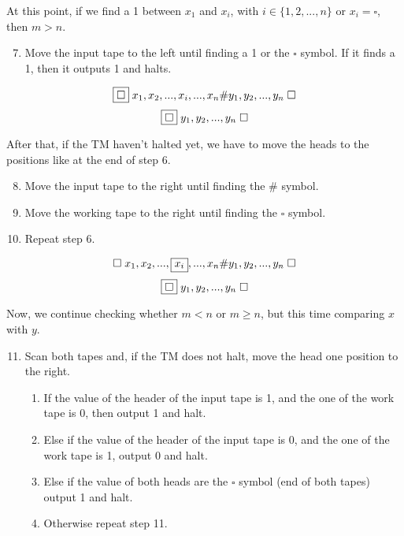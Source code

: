 \documentclass[a4paper, 10pt]{article}
\begin{document}
At this point, if we find a 1 between $x_1$ and $x_i$, with $i \in \{1,2,...,n\}$ or $x_i = \square$, then $m > n$.
\begin{enumerate}\setcounter{enumi}{6}
    \item Move the input tape to the left until finding a 1 or the $\square$ symbol. If it finds a 1, then it outputs 1 and halts.
\end{enumerate}
\[
    \boxed{\square} \hspace{1mm} x_1,x_2,...,x_i,...,x_n \# y_1,y_2,...,y_n \hspace{1mm} \square
\]
\[
    \boxed{\square} \hspace{1mm} y_1,y_2,...,y_n \hspace{1mm} \square   
\]

After that, if the TM haven't halted yet, we have to move the heads to the positions like at the end of step 6.
\begin{enumerate}\setcounter{enumi}{7}
    \item Move the input tape to the right until finding the $\#$ symbol.
    \item Move the working tape to the right until finding the $\square$ symbol.
    \item Repeat step 6.
\end{enumerate}

\[
    \square \hspace{1mm} x_1,x_2,...,\boxed{x_i},...,x_n \# y_1,y_2,...,y_n \hspace{1mm} \square
\]
\[
    \boxed{\square} \hspace{1mm} y_1,y_2,...,y_n \hspace{1mm} \square   
\]

Now, we continue checking whether $m < n$ or $m \geq n$, but this time comparing $x$ with $y$. 
\begin{enumerate}\setcounter{enumi}{10}
    \item Scan both tapes and, if the TM does not halt, move the head one position to the right. \begin{enumerate}
        \item If the value of the header of the input tape is 1, and the one of the work tape is 0, then output 1 and halt.
        \item Else if the value of the header of the input tape is 0, and the one of the work tape is 1, output 0 and halt.
        \item Else if the value of both heads are the $\square$ symbol (end of both tapes) output 1 and halt.
        \item Otherwise repeat step 11.
    \end{enumerate}
\end{enumerate}
\end{document}
